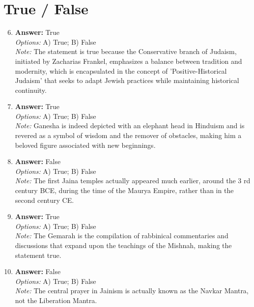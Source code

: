 \documentclass[12pt]{article}
\begin{document}
\section*{True / False}
\begin{enumerate}[label=\arabic*.]
\setcounter{enumi}{5}
\item \textbf{Answer:} True
\\ \textit{Options:} A) True; B) False
\\ \textit{Note:} The statement is true because the Conservative branch of Judaism, initiated by Zacharias Frankel, emphasizes a balance between tradition and modernity, which is encapsulated in the concept of 'Positive-Historical Judaism' that seeks to adapt Jewish practices while maintaining historical continuity.
\item \textbf{Answer:} True
\\ \textit{Options:} A) True; B) False
\\ \textit{Note:} Ganesha is indeed depicted with an elephant head in Hinduism and is revered as a symbol of wisdom and the remover of obstacles, making him a beloved figure associated with new beginnings.
\item \textbf{Answer:} False
\\ \textit{Options:} A) True; B) False
\\ \textit{Note:} The first Jaina temples actually appeared much earlier, around the 3 rd century BCE, during the time of the Maurya Empire, rather than in the second century CE.
\item \textbf{Answer:} True
\\ \textit{Options:} A) True; B) False
\\ \textit{Note:} The Gemarah is the compilation of rabbinical commentaries and discussions that expand upon the teachings of the Mishnah, making the statement true.
\item \textbf{Answer:} False
\\ \textit{Options:} A) True; B) False
\\ \textit{Note:} The central prayer in Jainism is actually known as the Navkar Mantra, not the Liberation Mantra.
\end{enumerate}
\end{document}

